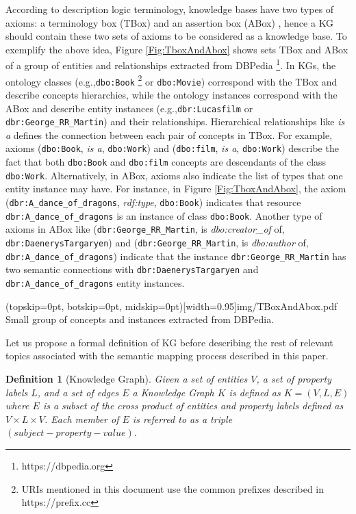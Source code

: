 \documentclass{ieeeaccess}
\newtheorem{Definition}{Definition}
\begin{document}
According to description logic terminology, knowledge bases 
have two types of axioms: a terminology box (TBox) and an 
assertion box (ABox) \cite{horrocks2008ontologies}, hence a 
KG should contain these two sets of axioms to be considered
as a knowledge base. To exemplify the above idea, Figure 
\ref{Fig:TboxAndAbox} shows sets TBox and ABox of a group 
of entities and relationships extracted from DBPedia
\cite{auer2007dbpedia} \footnote{https://dbpedia.org}. In 
KGs, the ontology classes (e.g.,\texttt{dbo:Book} 
\footnote{URIs mentioned in this document use the common 
prefixes described in https://prefix.cc} or \texttt{dbo:Movie})
correspond with the TBox and describe concepts hierarchies, 
while the ontology instances correspond with the ABox 
and describe entity instances (e.g.,\texttt{dbr:Lucasfilm} or \texttt{dbr:George\_RR\_Martin}) and their
relationships.  Hierarchical relationships like \textit{is a}
defines the connection between each pair of concepts in TBox. 
For example, axioms (\texttt{dbo:Book}, \textit{is a}, 
\texttt{dbo:Work}) and (\texttt{dbo:film}, \textit{is a}, 
\texttt{dbo:Work}) describe the fact that both \texttt{dbo:Book} 
and \texttt{dbo:film} concepts are descendants of the class
\texttt{dbo:Work}. Alternatively, in ABox, axioms also
indicate the list of types that one entity instance may
have. For instance, in Figure \ref{Fig:TboxAndAbox}, the axiom (\texttt{dbr:A\_dance\_of\_dragons}, \textit{rdf:type},
\texttt{dbo:Book}) indicates that resource
\texttt{dbr:A\_dance\_of\_dragons} is an instance of class
\texttt{dbo:Book}. Another type of axioms in ABox like
(\texttt{dbr:George\_RR\_Martin}, is \textit{dbo:creator\_of}
of, \texttt{dbr:DaenerysTargaryen}) and 
(\texttt{dbr:George\_RR\_Martin}, is \textit{dbo:author} of,
\texttt{dbr:A\_dance\_of\_dragons}) indicate
that the instance \texttt{dbr:George\_RR\_Martin} has two semantic
connections with \texttt{dbr:DaenerysTargaryen} and 
\texttt{dbr:A\_dance\_of\_dragons} entity instances.

\Figure[h!](topskip=0pt, botskip=0pt, midskip=0pt)[width=0.95\textwidth]{img/TBoxAndAbox.pdf}
{Small group of concepts and instances extracted from DBPedia. \label{Fig:TboxAndAbox}}

Let us propose a formal definition of KG before describing
the rest of relevant topics associated with the semantic 
mapping process described in this paper.

\begin{Definition}[Knowledge Graph]
Given a set of entities $V$, a set of property labels $L$,
and a set of edges $E$ a Knowledge Graph $K$ is defined as
$K = (V, L, E)$ where $E$ is a subset of the cross
product of entities and property labels defined as 
$V \times L \times V$. Each member of $E$ is referred to as a
triple $(subject-property-value)$.
\end{Definition}
\end{document}
